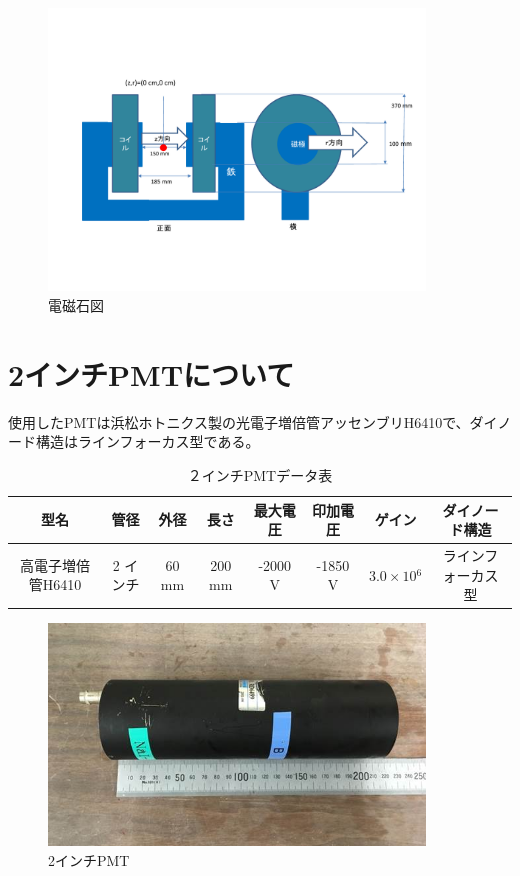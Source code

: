 \begin{figure}[H]
	\centering
		\includegraphics[width=10cm]{fig/iguchi/magnetfigure.pdf}
	\caption{電磁石図}
	\label{magnetfigure}
\end{figure}

\section{2インチPMTについて}
使用したPMTは浜松ホトニクス製の光電子増倍管アッセンブリH6410で、ダイノード構造はラインフォーカス型である。
\begin{table}[htb]
	\centering
	
	  \begin{tabular}{cccccccc}\hline
		型名& 管径 & 外径 & 長さ & 最大電圧 & 印加電圧 & ゲイン & ダイノード構造 \\ \hline \hline
		高電子増倍管H6410 & 2 インチ & 60 mm & 200 mm & -2000 V & -1850 V & $3.0\times10{^{6}}$ &ラインフォーカス型 \\ \hline
	\end{tabular}
	  \caption{２インチPMTデータ表}
\end{table}

\begin{figure}[H]
	\centering
		\includegraphics[width=10cm]{fig/iguchi/PMTphoto.jpg}
	\caption{2インチPMT}
	\label{PMTphoto}
\end{figure}

